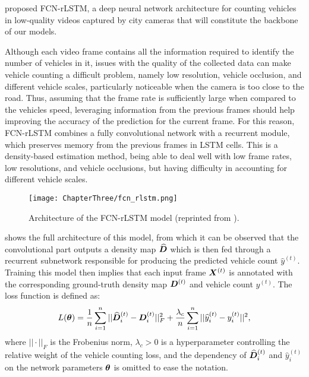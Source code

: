 \citet{Zhang2017} proposed FCN-rLSTM, a deep neural network architecture for counting vehicles in low-quality videos captured by city cameras that will constitute the backbone of our models. 

Although each video frame contains all the information required to identify the number of vehicles in it, issues with the quality of the collected data can make vehicle counting a difficult problem, namely low resolution, vehicle occlusion, and different vehicle scales, particularly noticeable when the camera is too close to the road. Thus, assuming that the frame rate is sufficiently large when compared to the vehicles speed, leveraging information from the previous frames should help improving the accuracy of the prediction for the current frame. For this reason, FCN-rLSTM combines a fully convolutional network with a recurrent module, which preserves memory from the previous frames in LSTM cells. This is a density-based estimation method, being able to deal well with low frame rates, low resolutions, and vehicle occlusions, but having difficulty in accounting for different vehicle scales.

\begin{figure}
	\centering
	\texttt{[image: ChapterThree/fcn\_rlstm.png]}
	\caption{Architecture of the FCN-rLSTM model (reprinted from \citet{Zhang2017}).}
	\label{fig:fcn_rlstm}
\end{figure}

 shows the full architecture of this model, from which it can be observed that the convolutional part outputs a density map $\widehat{{\bm{D}}}$ which is then fed through a recurrent subnetwork responsible for producing the predicted vehicle count $\widehat{y}^{(t)}$. Training this model then implies that each input frame ${\bm{X}}^{(t)}$ is annotated with the corresponding ground-truth density map ${\bm{D}}^{(t)}$ and vehicle count $y^{(t)}$. The loss function is defined as:
\begin{equation}
	L({\bm{\theta}}) = \frac{1}{n} \sum_{i=1}^{n} ||\widehat{{\bm{D}}}^{(t)}_i - {\bm{D}}^{(t)}_i||^2_F + \frac{\lambda_c}{n} \sum_{i=1}^{n} ||\widehat{y}^{(t)}_i - y^{(t)}_i||^2,
\end{equation}
where $||\cdot||_F$ is the Frobenius norm, $\lambda_c > 0$ is a hyperparameter controlling the relative weight of the vehicle counting loss, and the dependency of $\widehat{{\bm{D}}}^{(t)}_i$ and $\hat{y}^{(t)}_i$ on the network parameters ${\bm{\theta}}$ is omitted to ease the notation.